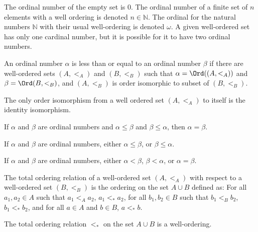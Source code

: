 \documentclass[crop=false,class=article,oneside]{standalone}
\begin{document}
        The ordinal number of the empty set is $0$. The
        ordinal number of a finite set of $n$ elements with
        a well ordering is denoted $n\in\mathbb{N}$.
        The ordinal for the natural numbers $\mathbb{N}$
        with their usual well-ordering is denoted $\omega$.
        A given well-ordered set has only one cardinal number,
        but it is possible for it to have two ordinal numbers.
        \begin{definition}
           An ordinal number $\alpha$ is less than or equal
           to an ordinal number $\beta$ if there are
           well-ordered sets $(A,<_{A})$ and $(B,<_{B})$
           such that $\alpha=\Ord((A,<_{A}))$ and
           $\beta=\Ord(B,<_{B})$, and $(A,<_{B})$ is
           order isomorphic to subset of
           $(B,<_{B})$.
        \end{definition}
        \begin{theorem*}
           The only order isomorphism from a well ordered
           set $(A,<_{A})$ to itself is the identity
           isomorphism.
        \end{theorem*}
        \begin{theorem*}
           If $\alpha$ and $\beta$ are ordinal numbers and
           ${\alpha}\leq{\beta}$ and ${\beta}\leq{\alpha}$,
           then $\alpha=\beta$.
        \end{theorem*}
        \begin{theorem*}
           If $\alpha$ and $\beta$ are ordinal numbers,
           either ${\alpha}\leq{\beta}$, or
           ${\beta}\leq{\alpha}$.
        \end{theorem*}
        \begin{theorem*}
           If $\alpha$ and $\beta$ are ordinal numbers,
           either $\alpha<\beta$, $\beta<\alpha$, or
           $\alpha=\beta$.
        \end{theorem*}
        \begin{definition}
           The total ordering relation of a
           well-ordered set $(A,<_{A})$ with respect
           to a well-ordered set $(B,<_{B})$ is the ordering
           on the set ${A}\cup{B}$ defined as: For all
           $a_{1},a_{2}\in{A}$ such that $a_{1}<_{A}a_{2}$,
           $a_{1}<_{*}a_{2}$, for all $b_{1},b_{2}\in{B}$
           such that $b_{1}<_{B}b_{2}$, $b_{1}<_{*}b_{2}$,
           and for all ${a}\in{A}$ and ${b}\in{B}$,
           ${a}<_{*}{b}$.
        \end{definition}
        \begin{theorem*}
           The total ordering relation $<_{*}$ on the set
           ${A}\cup{B}$ is a well-ordering.
        \end{theorem*}
\end{document}
